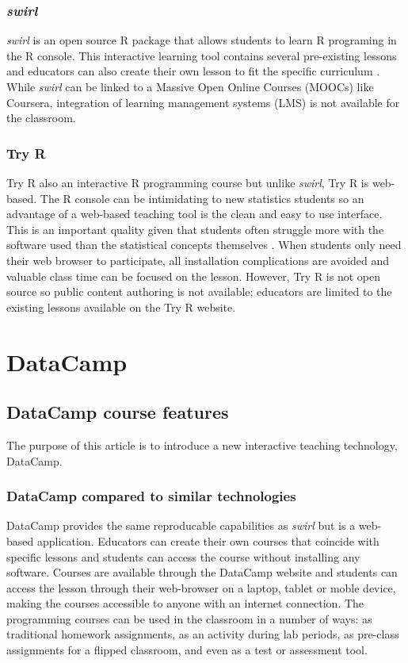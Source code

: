 \documentclass[12pt]{article}\usepackage[]{graphicx}\usepackage[]{color}
\begin{document}
\subsubsection{\textit{swirl}}
\textit{swirl} is an
open source R package that allows students to learn R programing in the R console. This interactive learning tool
contains several pre-existing lessons and educators can also create their own
lesson to fit the specific curriculum \citep{Carchedi2014}.
While \textit{swirl} can be linked to a Massive Open Online Courses (MOOCs) like Coursera, integration of learning management 
systems (LMS) is not available for the classroom. 

\subsubsection{Try R}
Try R \citep{TryR} also an interactive R programming course but unlike \textit{swirl}, Try R is web-based. 
The R console can be intimidating to
new statistics students so an advantage of a web-based teaching tool is
the clean and easy to use interface. This is an important quality given that students often struggle more with the
software used than the statistical concepts themselves \citep{Hare2017}. When students only need their web browser to participate,
all installation complications are avoided and valuable class time can be focused on the lesson.
However, Try R is not open source so public content authoring
is not available; educators are limited to the existing lessons available on the Try R website. 

\section{DataCamp}


\subsection{DataCamp course features}

The purpose of this article is to introduce a new interactive teaching technology, DataCamp.

\subsubsection{DataCamp compared to similar technologies}
DataCamp provides the same reproducable capabilities as \textit{swirl} but is a web-based application. Educators can
create their own courses that coincide with specific lessons and students can access the course without installing any software.
Courses are available through the DataCamp website and students can access the lesson through their web-browser on a laptop,
tablet or moble device, making the courses accessible to anyone with an internet connection. The programming courses can be used in the 
classroom in a number of ways: as traditional homework assignments, as an activity during lab periods, as pre-class assignments
for a flipped classroom, and even as a test or assessment tool.
\end{document}
